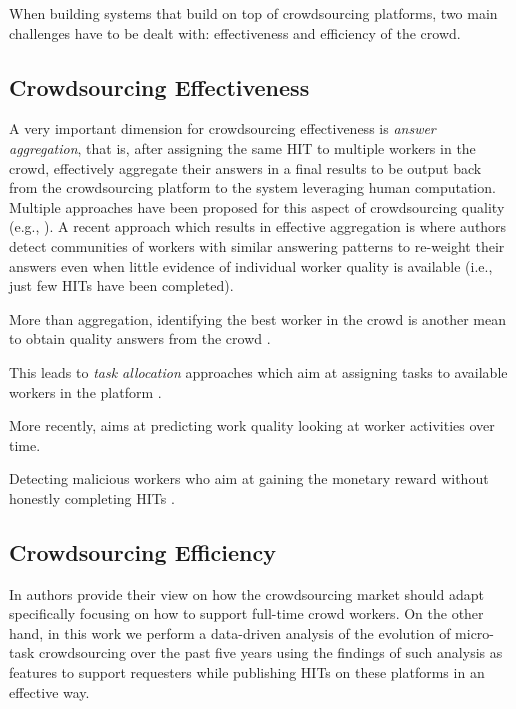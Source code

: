 When building systems that build on top of crowdsourcing platforms, two main challenges have to be dealt with: effectiveness and efficiency  of the crowd.

\subsection{Crowdsourcing Effectiveness}

A very important dimension for crowdsourcing effectiveness is \emph{answer aggregation}, that is, after assigning the same HIT to multiple workers in the crowd, effectively aggregate their answers in a final results to be output back from the crowdsourcing platform to the system leveraging human computation. Multiple approaches have been proposed for this aspect of crowdsourcing quality (e.g.,
\cite{Venanzi:2014:CBA:2566486.2567989,square,zencrowd,Hosseini:2012:ALM:2260641.2260661}).
% 
A recent approach which results in effective aggregation is \cite{Venanzi:2014:CBA:2566486.2567989} where authors detect communities of workers with similar answering patterns to re-weight their answers even when little evidence of individual worker quality is available (i.e., just few HITs have been completed).


More than aggregation, identifying the best worker in the crowd is another mean to obtain quality answers from the crowd \cite{pickacrowd,bozzon}.

This leads to \emph{task allocation} approaches which aim at assigning tasks to available workers in the platform \cite{goel2014mechanism,crowdstar}.

More recently, \cite{Jung14-hcomp} aims at predicting work quality looking at worker activities over time.


Detecting malicious workers who aim at gaining the monetary reward without honestly  completing HITs \cite{collusion}.

\subsection{Crowdsourcing Efficiency}

In \cite{Kittur:2013:FCW:2441776.2441923} authors provide their view on how the crowdsourcing market should adapt specifically focusing on how to  support full-time crowd workers. On the other hand, in this work we perform a data-driven analysis of the evolution of micro-task crowdsourcing over the past five years using the findings of such analysis as features to support requesters while publishing HITs on these platforms in an effective way.

